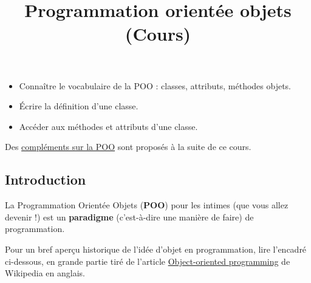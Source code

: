 \documentclass[
  french,
  letterpaper,
  DIV=11,
  numbers=noendperiod]{scrartcl}
\title{Programmation orientée objets (Cours)}
\author{}
\date{}
\providecommand{\tightlist}{%
  \setlength{\itemsep}{0pt}\setlength{\parskip}{0pt}}
\begin{document}
\maketitle

  \chead{} \cfoot{}   \renewcommand{\headrulewidth}{0pt} \renewcommand{\footrulewidth}{0pt} \thispagestyle{fancy} \vspace{-2cm}


\begin{tcolorbox}[enhanced jigsaw, breakable, title=\textcolor{quarto-callout-tip-color}{\faLightbulb}\hspace{0.5em}{Objectifs}, toptitle=1mm, coltitle=black, colback=white, left=2mm, colbacktitle=quarto-callout-tip-color!10!white, opacityback=0, opacitybacktitle=0.6, bottomtitle=1mm, colframe=quarto-callout-tip-color-frame, bottomrule=.15mm, rightrule=.15mm, arc=.35mm, titlerule=0mm, toprule=.15mm, leftrule=.75mm]

\begin{itemize}
\tightlist
\item
  Connaître le vocabulaire de la POO : classes, attributs, méthodes
  objets.
\item
  Écrire la définition d'une classe.
\item
  Accéder aux méthodes et attributs d'une classe.
\end{itemize}

\end{tcolorbox}

Des \href{POO_complements.qmd}{compléments sur la POO} sont proposés à
la suite de ce cours.

\subsection{Introduction}\label{introduction}

La Programmation Orientée Objets (\textbf{POO}) pour les intimes (que
vous allez devenir !) est un \textbf{paradigme} (c'est-à-dire une
manière de faire) de programmation.

Pour un bref aperçu historique de l'idée d'objet en programmation, lire
l'encadré ci-dessous, en grande partie tiré de l'article
\href{https://en.wikipedia.org/wiki/Object-oriented_programming}{Object-oriented
programming} de Wikipedia en anglais.
\end{document}
